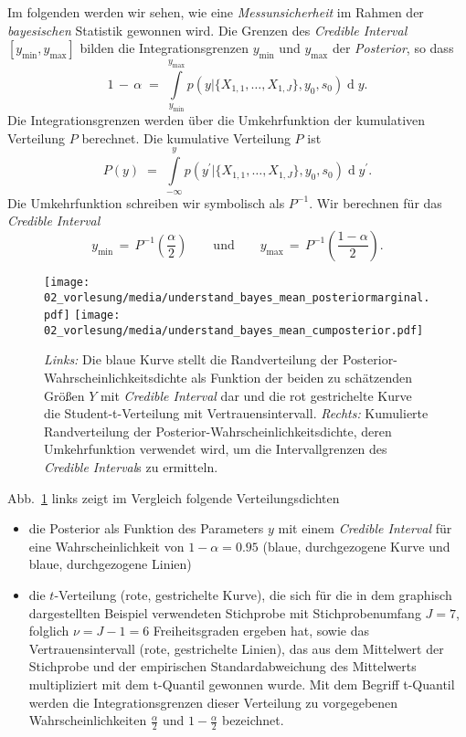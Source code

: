 Im folgenden werden wir sehen, wie eine \textsl{Messunsicherheit} im Rahmen der
\textsl{bayesischen} Statistik gewonnen wird.
Die Grenzen des \textsl{Credible Interval} $[y_\mathrm{min}, y_\mathrm{max}]$ bilden die
Integrationsgrenzen $y_\mathrm{min}$ und $y_\mathrm{max}$ der \textsl{Posterior}, so dass
\begin{equation}
1 \, - \, \alpha \; = \; 
\int\limits_{y_\mathrm{min}}^{y_\mathrm{max}} p(y | \{X_{1,1}, \dots, X_{1,J}\}, y_0, s_0) 
\operatorname{d}y .
\label{UeberdeckungPosterior}
\end{equation}
Die Integrationsgrenzen werden über die Umkehrfunktion der kumulativen Verteilung $P$ berechnet.
Die kumulative Verteilung $P$ ist
\begin{equation}
P(y) \; = \; \int\limits_{-\infty}^{y} p(y^\prime | \{X_{1,1}, \dots, X_{1,J}\}, y_0, s_0) 
\operatorname{d}y^\prime .
\end{equation}
Die Umkehrfunktion schreiben wir symbolisch als $P^{-1}$.
Wir berechnen für das \textsl{Credible Interval}
\begin{equation}
y_\mathrm{min} \, = \, P^{-1}(\frac{\alpha}{2}) \qquad \mathrm{und} \qquad
y_\mathrm{max} \, = \, P^{-1}(\frac{1-\alpha}{2}).
\end{equation}
\begin{figure}
\begin{center}
\texttt{[image: 02\_vorlesung/media/understand\_bayes\_mean\_posteriormarginal.pdf]}
\hspace{5mm}
\texttt{[image: 02\_vorlesung/media/understand\_bayes\_mean\_cumposterior.pdf]}
\caption{\label{posteriorCredible}\textsl{Links:} Die blaue Kurve stellt die
Randverteilung der Posterior-Wahrscheinlichkeitsdichte als Funktion
der beiden zu schätzenden Größen $Y$ mit \textsl{Credible Interval} dar und die
rot gestrichelte Kurve die Student-t-Verteilung mit Vertrauensintervall.
\textsl{Rechts:} Kumulierte Randverteilung der Posterior-Wahrscheinlichkeitsdichte, deren
Umkehrfunktion verwendet wird, um die Intervallgrenzen des \textsl{Credible Interval}s zu ermitteln.}
\end{center}
\end{figure}
Abb.~\ref{posteriorCredible} links zeigt im Vergleich folgende Verteilungsdichten
\begin{itemize}
\item die Posterior als Funktion des Parameters
$y$ mit einem \textsl{Credible Interval} für eine Wahrscheinlichkeit von
$1 - \alpha = 0.95$ (blaue, durchgezogene Kurve und blaue, durchgezogene Linien)
\item die $t$-Verteilung (rote, gestrichelte Kurve), die sich für die in dem
graphisch dargestellten Beispiel verwendeten Stichprobe mit Stichprobenumfang $J = 7$, folglich
$\nu = J - 1 = 6$ Freiheitsgraden ergeben hat, sowie das Vertrauensintervall (rote, gestrichelte Linien),
das aus dem Mittelwert der Stichprobe
und der empirischen Standardabweichung des Mittelwerts multipliziert mit dem
t-Quantil gewonnen wurde. Mit dem Begriff t-Quantil werden die Integrationsgrenzen dieser Verteilung
zu vorgegebenen Wahrscheinlichkeiten $\frac{\alpha}{2}$ und $1 - \frac{\alpha}{2}$ bezeichnet.
\end{itemize}

